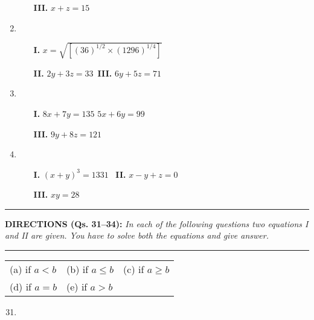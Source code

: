 \begin{multicols}{2}
\begin{enumerate}[leftmargin=*]
\begin{itemize}
\item[{\bf III.}] $x+z=15$
\end{itemize}

\item 
\begin{itemize}
\item[{\bf I.}] $x=\sqrt{\left[(36)^{1/2}\times(1296)^{1/4}\right]}$

\item[{\bf II.}] $2y+3z=33$\qquad\qquad~{\bf III.} $6y+5z=71$
\end{itemize}

\item 
\begin{itemize}
\item[{\bf I.}] $8x+7y=135$\qquad{} $5x+6y=99$

\item[{\bf III.}] $9y+8z=121$
\end{itemize}

\item 
\begin{itemize}
\item[{\bf I.}] $(x+y)^{3}=1331$\qquad\quad~ {\bf II.} $x-y+z=0$

\item[{\bf III.}] $xy=28$
\end{itemize}

\end{enumerate}

\noindent
\rule{\columnwidth}{1pt}

\noindent
{\sf\bfseries DIRECTIONS (Qs. 31--34):} {\it In each of the following questions two equations I and II are given. You have to solve both the equations and give answer.}

\noindent
\rule{\columnwidth}{1pt}

\begin{tabular}{l@{\qquad\quad}l@{\qquad\quad}l}
(a) if $a<b$ & (b) if $a\leq b$ & (c) if $a\geq b$\\
(d) if $a=b$ & (e) if $a>b$ 
\end{tabular}

\begin{enumerate}[leftmargin=*]
\setcounter{enumi}{30}
\item 
\begin{itemize}
\end{itemize}


\end{enumerate}
\end{multicols}

